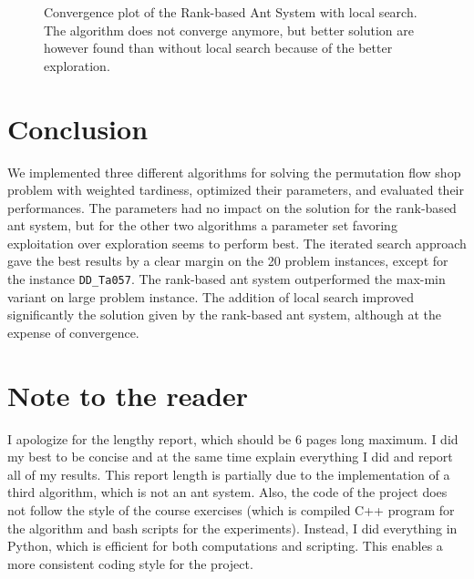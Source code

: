\documentclass[runningheads]{llncs}
\begin{document}
\begin{figure}
\begin{minipage}{.48\textwidth}
		\caption{Convergence plot of the Rank-based Ant System with local
		search. The algorithm does not converge anymore, but better solution are
		however found than without local search because of the better
		exploration.}
		\label{DD_Ta060-convergence-LS}
    \end{minipage}
\end{figure}

\section{Conclusion}
\label{sec:conclusion}

We implemented three different algorithms for solving the permutation flow shop
problem with weighted tardiness, optimized their parameters, and evaluated their
performances. The parameters had no impact on the solution for the rank-based
ant system, but for the other two algorithms a parameter set favoring
exploitation over exploration seems to perform best. The iterated search
approach gave the best results by a clear margin on the 20 problem instances,
except for the instance \texttt{DD\_Ta057}. The rank-based ant system
outperformed the max-min variant on large problem instance. The addition of
local search improved significantly the solution given by the rank-based ant
system, although at the expense of convergence.

\section*{Note to the reader}

I apologize for the lengthy report, which should be 6 pages long maximum. I did
my best to be concise and at the same time explain everything I did and report
all of my results. This report length is partially due to the implementation of
a third algorithm, which is not an ant system. Also, the code of the project
does not follow the style of the course exercises (which is compiled C++ program
for the algorithm and bash scripts for the experiments). Instead, I did
everything in Python, which is efficient for both computations and scripting.
This enables a more consistent coding style for the project.



\end{document}
